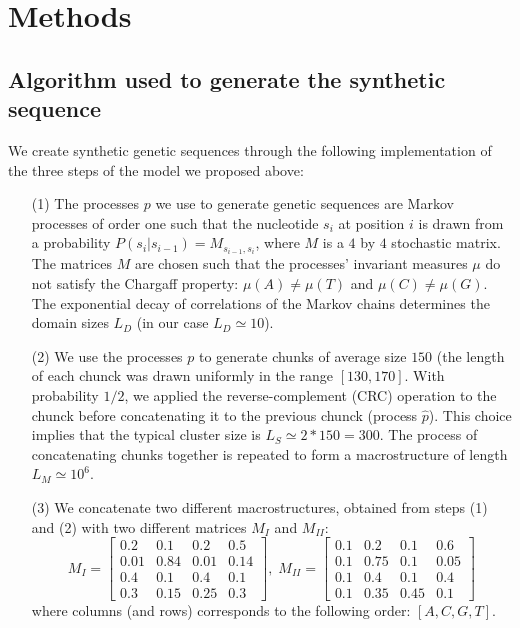 \documentclass[fleqn,10pt]{wlscirep}
\begin{document}
\section*{Methods}
\subsection*{Algorithm used to generate the synthetic sequence}

We create synthetic genetic sequences through the following implementation of the three steps of the model we proposed above:

\begin{itemize}
  
\item[(1)] The processes $p$ we use to generate genetic sequences are Markov processes of order one such that the nucleotide $s_i$ at position $i$ is drawn from a probability $P(s_i | s_{i-1}) = M_{ s_{i-1},s_i}$, where $M$ is a $4$ by $4$ stochastic matrix. The matrices $M$ are chosen such that the processes' invariant measures $\mu$ do not satisfy the Chargaff property: $\mu(A)\neq \mu(T)$ and $\mu(C)\neq \mu(G)$. The exponential decay of correlations of the Markov chains determines the domain sizes $L_D$ (in our case  $L_D\simeq 10$).


\item[(2)]  We use the processes $p$ to generate chunks of average size $150$ (the length of each chunck was drawn uniformly in the range $[130,170]$. With probability $1/2$, we applied the reverse-complement (CRC) operation to the chunck before concatenating it to the previous chunck (process $\hat{p}$). This choice implies that the typical cluster size is $L_S\simeq 2*150=300$. The process of concatenating chunks together is repeated to form a macrostructure of length $L_M \simeq 10^6$.

\item[(3)] We concatenate two different macrostructures, obtained from steps (1) and (2) with two different matrices $M_I$ and $M_{II}$:
  $$
  M_I = \begin{bmatrix}
     0.2 & 0.1 & 0.2 & 0.5 \\ 0.01 & 0.84 & 0.01 & 0.14 \\ 0.4 & 0.1 & 0.4 & 0.1 \\ 0.3 & 0.15 & 0.25 & 0.3 
    \end{bmatrix},\;     M_{II} = \begin{bmatrix}
       0.1 & 0.2& 0.1& 0.6\\ 0.1& 0.75& 0.1& 0.05\\ 0.1& 0.4& 0.1& 0.4\\ 0.1& 0.35& 0.45& 0.1
    \end{bmatrix}
    $$
where columns (and rows) corresponds to the following order:  $[A,C,G,T]$.
\end{itemize}
  
\end{document}
